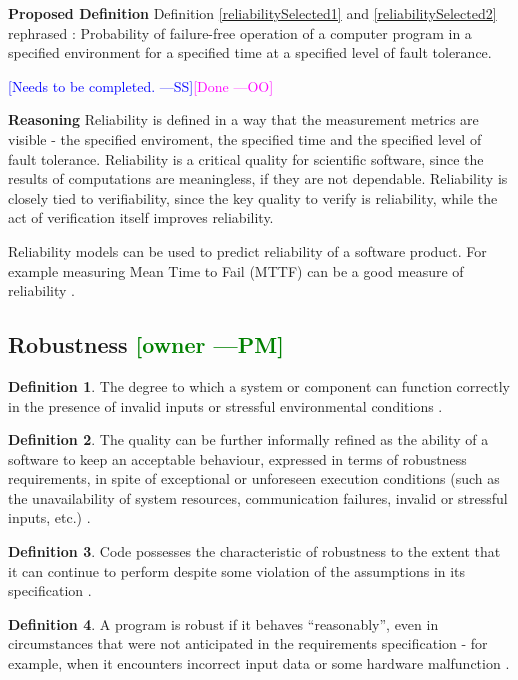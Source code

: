 \documentclass[letterpaper,cleveref]{lipics-v2019}
\newcommand{\authornote}[3]{\textcolor{#1}{[#3 ---#2]}}
\newcommand{\authornote}[3]{}
\newcommand{\wss}[1]{\authornote{blue}{SS}{#1}} %
\newcommand{\oo}[1]{\authornote{magenta}{OO}{#1}} %
\newcommand{\pmi}[1]{\authornote{green}{PM}{#1}} %
\theoremstyle{definition}
\newtheorem{defn}{Definition}
\begin{document}
\noindent \textbf{Proposed Definition}
Definition \ref{reliabilitySelected1} and \ref{reliabilitySelected2} rephrased : 	Probability of failure-free operation of a computer program in a specified environment for a specified time at a specified level of fault tolerance.

\wss{Needs to be completed.}\oo{Done}

\noindent \textbf{Reasoning}
Reliability is defined in a way that the measurement metrics are visible - the specified enviroment, the specified time and the specified level of fault tolerance. Reliability is a critical quality for scientific software, since the results of
computations are meaningless, if they are not dependable.  Reliability is
closely tied to verifiability, since the key quality to verify is reliability,
while the act of verification itself improves reliability.

Reliability models can be used to predict reliability of a software product. For
example measuring Mean Time to Fail (MTTF) can be a good measure of reliability
\citep{berander2005software}.

\subsection{{Robustness} \pmi{owner}}
\begin{defn}
	The degree to which a system or component can function correctly in the
	presence of invalid inputs or stressful environmental conditions
	\citep{IEEEStdGlossarySET1990}.
\end{defn}
\begin{defn}
	The quality can be further informally refined as the ability of a software to
	keep an acceptable behaviour, expressed in terms of robustness requirements,
	in
	spite of exceptional or unforeseen execution conditions (such as the
	unavailability of system resources, communication failures, invalid or
	stressful inputs, etc.) \citep{fernandez2005model}.
\end{defn}
\begin{defn} \label{RobustnessPartialDefn}
	Code possesses the characteristic of robustness to the extent that it can
	continue to perform despite some violation of the assumptions in its
	specification \citep{boehm2007software}.
\end{defn}
\begin{defn} \label{RobustnessDefnSelected}
	A program is robust if it behaves ``reasonably'', even in circumstances that
	were not anticipated in the requirements specification - for example, when it
	encounters incorrect input data or some hardware malfunction
	\citep{ghezzi1991fundamentals}.
\end{defn}
\end{document}
